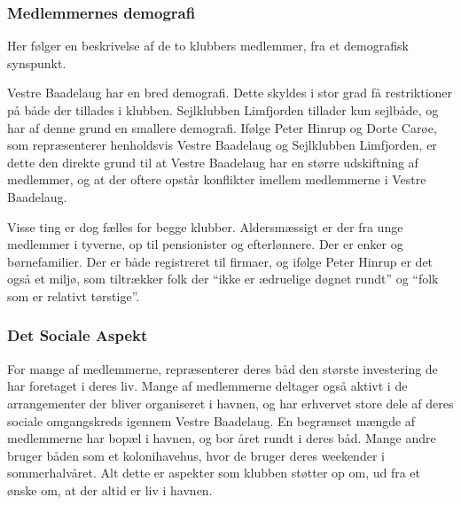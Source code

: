 \subsubsection{Medlemmernes demografi}

Her følger en beskrivelse af de to klubbers medlemmer, fra et demografisk synspunkt.

Vestre Baadelaug har en bred demografi. Dette skyldes i stor grad få restriktioner på både der tillades i klubben. Sejlklubben Limfjorden tillader kun sejlbåde, og har af denne grund en smallere demografi. Ifølge Peter Hinrup og Dorte Carøe, som repræsenterer henholdsvis Vestre Baadelaug og Sejlklubben Limfjorden, er dette den direkte grund til at Vestre Baadelaug har en større udskiftning af medlemmer, og at der oftere opstår konflikter imellem medlemmerne i Vestre Baadelaug.


Visse ting er dog fælles for begge klubber. Aldersmæssigt er der fra unge medlemmer i tyverne, op til pensionister og efterlønnere. Der er enker og børnefamilier. Der er både registreret til firmaer, og ifølge Peter Hinrup er det også et miljø, som tiltrækker folk der \enquote{ikke er ædruelige døgnet rundt} og \enquote{folk som er relativt tørstige}.


\subsubsection{Det Sociale Aspekt}

For mange af medlemmerne, repræsenterer deres båd den største investering de har foretaget i deres liv. Mange af medlemmerne deltager også aktivt i de arrangementer der bliver organiseret i havnen, og har erhvervet store dele af deres sociale omgangskreds igennem Vestre Baadelaug. En begrænset mængde af medlemmerne har bopæl i havnen, og bor året rundt i deres båd. Mange andre bruger båden som et kolonihavehus, hvor de bruger deres weekender i sommerhalvåret. Alt dette er aspekter som klubben støtter op om, ud fra et ønske om, at der altid er liv i havnen.





